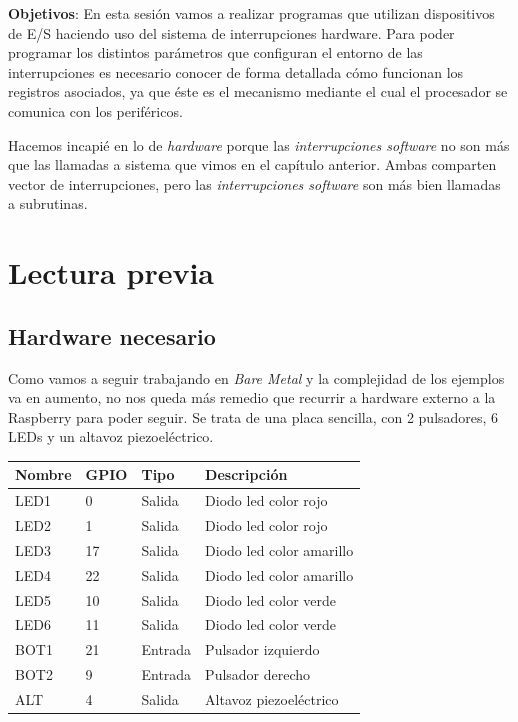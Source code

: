 

\label{chp:Interrupciones}
\minitoc

{\bf Objetivos}: En esta sesión vamos a realizar programas que
utilizan dispositivos de E/S haciendo uso del sistema de
interrupciones hardware. Para poder programar los distintos parámetros
que configuran el entorno de las interrupciones es necesario conocer de
forma detallada cómo funcionan los registros asociados, ya que
éste es el mecanismo mediante el cual el procesador se
comunica con los periféricos.

Hacemos incapié en lo de {\it hardware} porque las
{\it interrupciones software} no son más que las llamadas a sistema
que vimos en el capítulo anterior. Ambas comparten vector de interrupciones,
pero las {\it interrupciones software} son más bien llamadas a subrutinas.

\section{Lectura previa}

\subsection{Hardware necesario}

Como vamos a seguir trabajando en {\it Bare Metal} y la complejidad
de los ejemplos va en aumento, no nos queda más remedio que
recurrir a hardware externo a la Raspberry para poder seguir. Se
trata de una placa sencilla, con 2 pulsadores, 6 LEDs y un altavoz
piezoeléctrico.

\begin{longtable}{ p{1.8cm} | p{1.2cm} | p{2cm} | p{5cm}}
\hline
{\bf Nombre} & {\bf GPIO} & {\bf Tipo} & {\bf Descripción} \\ \hline
LED1 & 0 & Salida & Diodo led color rojo \\ \hline
LED2 & 1 & Salida & Diodo led color rojo \\ \hline
LED3 & 17 & Salida & Diodo led color amarillo \\ \hline
LED4 & 22 & Salida & Diodo led color amarillo \\ \hline
LED5 & 10 & Salida & Diodo led color verde \\ \hline
LED6 & 11 & Salida & Diodo led color verde \\ \hline
BOT1 & 21 & Entrada & Pulsador izquierdo \\ \hline
BOT2 & 9 & Entrada & Pulsador derecho \\ \hline
ALT & 4 & Salida & Altavoz piezoeléctrico \\ \hline
\end{longtable}

